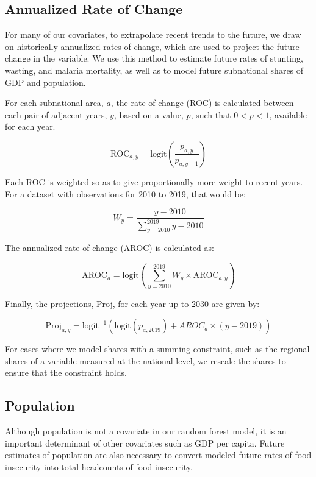 \documentclass{article}
\begin{document}
\subsection{Annualized Rate of Change}
For many of our covariates, to extrapolate recent trends to the future, we draw on historically annualized rates of change, which are used to project the future change in the variable. We use this method to estimate future rates of stunting, wasting, and malaria mortality, as well as to model future subnational shares of GDP and population.

For each subnational area, $a$, the rate of change (ROC) is calculated between each pair of adjacent years, $y$, based on a value, $p$, such that $0 < p < 1$, available for each year.

\begin{equation}
  \text{ROC}_{a,y} = \text{logit} \left( \frac{p_{a,y}}{p_{a,y-1}} \right)
  \label{eqn:a}
\end{equation}

Each ROC is weighted so as to give proportionally more weight to recent years.  For a dataset with observations for 2010 to 2019, that would be:

\begin{equation}
  W_y = \frac{y - 2010}{\sum_{y=2010}^{2019} y - 2010}
  \label{eqn:b}
\end{equation}

The annualized rate of change (AROC) is calculated as:

\begin{equation}
  \text{AROC}_{a} = \text{logit} \left( \sum_{y=2010}^{2019} W_y \times \text{AROC}_{a, y} \right)
  \label{eqn:c}
\end{equation}

Finally, the projections, Proj, for each year up to 2030 are given by:

\begin{equation}
  \text{Proj}_{a,y} = \text{logit}^{-1} ( \text{logit} ( p_{a,2019} ) + AROC_{a} \times ( y - 2019 ) )
  \label{eqn:d}
\end{equation}

For cases where we model shares with a summing constraint, such as the regional shares of a variable measured at the national level, we rescale the shares to ensure that the constraint holds.

\pagebreak
\subsection{Population}
Although population is not a covariate in our random forest model, it is an important determinant of other covariates such as GDP per capita. Future estimates of population are also necessary to convert modeled future rates of food insecurity into total headcounts of food insecurity. 
\end{document}
